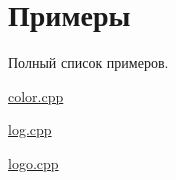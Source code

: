 \section{Примеры}
Полный список примеров.\begin{DoxyCompactItemize}
\item 
\hyperlink{color_8cpp-example}{color.\+cpp}
\item 
\hyperlink{log_8cpp-example}{log.\+cpp}
\item 
\hyperlink{logo_8cpp-example}{logo.\+cpp}
\end{DoxyCompactItemize}
